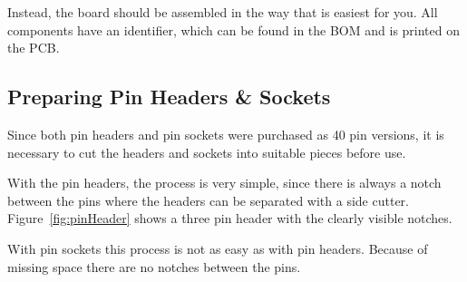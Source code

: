 Instead, the board should be assembled in the way that is easiest for you. All components have an identifier, which can be found in the BOM and is printed on the PCB.%

\subsection{Preparing Pin Headers \& Sockets}%
Since both pin headers and pin sockets were purchased as 40 pin versions, it is necessary to cut the headers and sockets into suitable pieces before use.%

%

With the pin headers, the process is very simple, since there is always a notch between the pins where the headers can be separated with a side cutter. Figure~\ref{fig:pinHeader} shows a three pin header with the clearly visible notches.%

With pin sockets this process is not as easy as with pin headers. Because of missing space there are no notches between the pins.%

